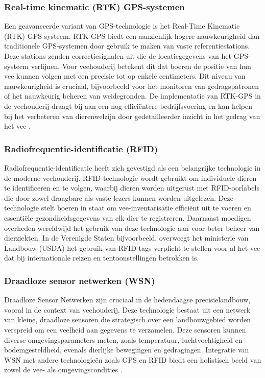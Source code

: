 \subsubsection{Real-time kinematic (RTK) GPS-systemen}
Een geavanceerde variant van GPS-technologie is het Real-Time Kinematic (RTK) GPS-systeem. RTK-GPS biedt een aanzienlijk hogere nauwkeurigheid dan traditionele GPS-systemen door gebruik te maken van vaste referentiestations. Deze stations zenden correctiesignalen uit die de locatiegegevens van het GPS-systeem verfijnen. Voor veehouderij betekent dit dat boeren de positie van hun vee kunnen volgen met een precisie tot op enkele centimeters. Dit niveau van nauwkeurigheid is cruciaal, bijvoorbeeld voor het monitoren van gedragspatronen of het nauwkeurig beheren van weidegronden. De implementatie van RTK-GPS in de veehouderij draagt bij aan een nog efficiëntere bedrijfsvoering en kan helpen bij het verbeteren van dierenwelzijn door gedetailleerder inzicht in het gedrag van het vee \autocite{keshavarzi2021validation}.
\subsubsection{Radiofrequentie-identificatie (RFID)}
Radiofrequentie-identificatie heeft zich gevestigd als een belangrijke technologie in de moderne veehouderij. 
RFID-technologie wordt gebruikt om individuele dieren te identificeren en te volgen, waarbij dieren worden uitgerust met RFID-oorlabels die door zowel draagbare als vaste lezers kunnen worden uitgelezen. Deze technologie stelt boeren in staat om vee-inventarisatie efficiënt uit te voeren en essentiële gezondheidsgegevens van elk dier te registreren. \autocite{voulodimos2009complete}
Daarnaast moedigen overheden wereldwijd het gebruik van deze technologie aan voor beter beheer van dierziekten. 
In de Verenigde Staten bijvoorbeeld, overweegt het ministerie van Landbouw (USDA) het gebruik van RFID-tags verplicht te stellen voor al het vee dat bij internationale reizen en tentoonstellingen betrokken is​​. \autocite{rfidjournal2024rfid}

\subsubsection{Draadloze sensor netwerken (WSN)}
Draadloze Sensor Netwerken zijn cruciaal in de hedendaagse precisielandbouw, vooral in de context van veehouderij. Deze technologie bestaat uit een netwerk van kleine, draadloze sensoren die strategisch over een landbouwgebied worden verspreid om een veelheid aan gegevens te verzamelen. Deze sensoren kunnen diverse omgevingsparameters meten, zoals temperatuur, luchtvochtigheid en bodemgesteldheid, evenals dierlijke bewegingen en gedragingen. Integratie van WSN met andere technologieën zoals GPS en RFID biedt een holistisch beeld van zowel de vee- als omgevingscondities \autocite{oja2015wireless}.

